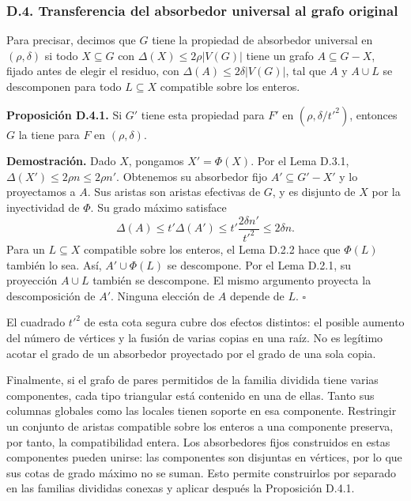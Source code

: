 \documentclass[spanish,11pt,a4paper]{article}
\begin{document}
\subsubsection{D.4. Transferencia del absorbedor universal al grafo original}\label{d.4.-transferencia-del-absorbedor-universal-al-grafo-original}

Para precisar, decimos que \(G\) tiene la propiedad de absorbedor universal en \((\rho,\delta)\) si todo \(X\subseteq G\) con \(\Delta(X)\le2\rho|V(G)|\) tiene un grafo \(A\subseteq G-X\), fijado antes de elegir el residuo, con \(\Delta(A)\le2\delta|V(G)|\), tal que \(A\) y \(A\cup L\) se descomponen para todo \(L\subseteq X\) compatible sobre los enteros.

\textbf{Proposición D.4.1.} Si \(G'\) tiene esta propiedad para \(F'\) en \((\rho,\delta/t'^2)\), entonces \(G\) la tiene para \(F\) en \((\rho,\delta)\).

\textbf{Demostración.} Dado \(X\), pongamos \(X'=\Phi(X)\). Por el Lema D.3.1, \(\Delta(X')\le2\rho n\le2\rho n'\). Obtenemos su absorbedor fijo \(A'\subseteq G'-X'\) y lo proyectamos a \(A\). Sus aristas son aristas efectivas de \(G\), y es disjunto de \(X\) por la inyectividad de \(\Phi\). Su grado máximo satisface \[\Delta(A)\le t'\Delta(A')
\le t'\frac{2\delta n'}{t'^2}
\le2\delta n.
\tag{D.4.1}\] Para un \(L\subseteq X\) compatible sobre los enteros, el Lema D.2.2 hace que \(\Phi(L)\) también lo sea. Así, \(A'\cup\Phi(L)\) se descompone. Por el Lema D.2.1, su proyección \(A\cup L\) también se descompone. El mismo argumento proyecta la descomposición de \(A'\). Ninguna elección de \(A\) depende de \(L\). \(\square\)

El cuadrado \(t'^2\) de esta cota segura cubre dos efectos distintos: el posible aumento del número de vértices y la fusión de varias copias en una raíz. No es legítimo acotar el grado de un absorbedor proyectado por el grado de una sola copia.

Finalmente, si el grafo de pares permitidos de la familia dividida tiene varias componentes, cada tipo triangular está contenido en una de ellas. Tanto sus columnas globales como las locales tienen soporte en esa componente. Restringir un conjunto de aristas compatible sobre los enteros a una componente preserva, por tanto, la compatibilidad entera. Los absorbedores fijos construidos en estas componentes pueden unirse: las componentes son disjuntas en vértices, por lo que sus cotas de grado máximo no se suman. Esto permite construirlos por separado en las familias divididas conexas y aplicar después la Proposición D.4.1.
\end{document}
